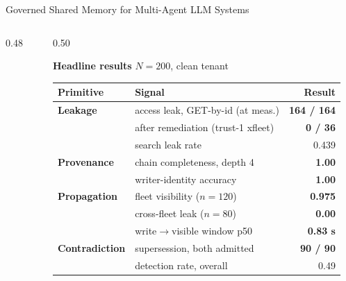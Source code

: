 \documentclass[10pt,aspectratio=169]{beamer}
\begin{document}
\begin{frame}[shrink]{Governed Shared Memory for Multi-Agent LLM Systems}
\begin{columns}[T,onlytextwidth]
\begin{column}{0.48\textwidth}
\end{column}

\begin{column}{0.50\textwidth}

\textbf{Headline results} \hfill {\scriptsize $N=200$, clean tenant}

\vspace{0.3em}

{\scriptsize
\renewcommand{\arraystretch}{1.05}
\begin{tabularx}{\linewidth}{lXr}
\toprule
Primitive & Signal & Result \\
\midrule
\textbf{Leakage}       & access leak, GET-by-id (at meas.)     & \textcolor{warn}{\textbf{164 / 164}} \\
                       & \quad after remediation (trust-1 xfleet) & \textcolor{good}{\textbf{0 / 36}} \\
                       & search leak rate                      & 0.439 \\
\midrule
\textbf{Provenance}    & chain completeness, depth 4           & \textcolor{good}{\textbf{1.00}} \\
                       & writer-identity accuracy              & \textcolor{good}{\textbf{1.00}} \\
\midrule
\textbf{Propagation}   & fleet visibility ($n=120$)            & \textcolor{good}{\textbf{0.975}} \\
                       & cross-fleet leak ($n=80$)             & \textcolor{good}{\textbf{0.00}} \\
                       & write$\to$visible window p50          & \textcolor{good}{\textbf{0.83 s}} \\
\midrule
\textbf{Contradiction} & supersession, both admitted           & \textcolor{good}{\textbf{90 / 90}} \\
                       & detection rate, overall               & \textcolor{warn}{0.49} \\
\bottomrule
\end{tabularx}
}

\vspace{0.4em}


\end{column}
\end{columns}
\end{frame}
\end{document}
